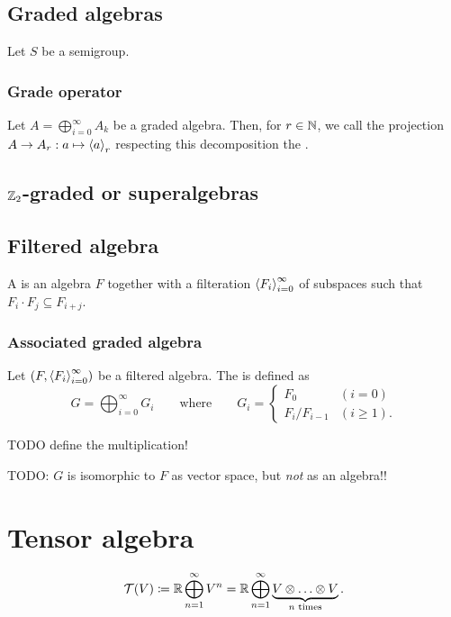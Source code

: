 \subsection{Graded algebras}
\begin{definition}
Let $S$ be a semigroup. 
\end{definition}

\subsubsection{Grade operator}
\begin{definition}
Let $A = \bigoplus_{i=0}^\infty A_k$ be a graded algebra. Then, for $r\in \mathbb{N}$, we call the projection $A\to A_r: a\mapsto \left\langle a \right\rangle_r$ respecting this decomposition the .
\end{definition}

\subsection{$\mathbb{Z}_2$-graded or superalgebras}

\subsection{Filtered algebra}
\begin{definition}
A  is an algebra $F$ together with a filteration $\left\langle F_i \right\rangle_{i=0}^\infty$ of subspaces such that $F_i\cdot F_j \subseteq F_{i+j}$.
\end{definition}

\subsubsection{Associated graded algebra}
\begin{definition}
Let $\left( F,\left\langle F_i \right\rangle_{i=0}^\infty \right)$ be a filtered algebra. The  is defined as
\[ G = \bigoplus_{i=0}^\infty G_i \qquad\text{where}\qquad G_i = \begin{cases}
F_0 & (i=0) \\
F_{i}/F_{i-1} & (i \geq 1).
\end{cases} \]
\end{definition}
TODO define the multiplication!

TODO: $G$ is isomorphic to $F$ as vector space, but \emph{not} as an algebra!!


\section{Tensor algebra}
\[ \mathcal{T}(V) \coloneqq \mathbb{R} \bigoplus_{n=1}^\infty V^n = \mathbb{R} \bigoplus_{n=1}^\infty \underbrace{V\otimes \ldots \otimes V}_{\text{$n$ times}}. \]

